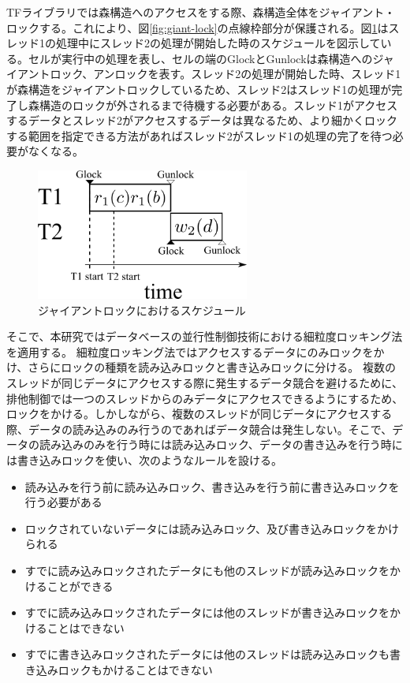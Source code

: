 \documentclass[a4paper]{jreport}	%
\begin{document}
TFライブラリでは森構造へのアクセスをする際、森構造全体をジャイアント・ロックする。これにより、図\ref{fig:giant-lock}の点線枠部分が保護される。図\ref{fig:g-lock-time}はスレッド1の処理中にスレッド2の処理が開始した時のスケジュールを図示している。セルが実行中の処理を表し、セルの端のGlockとGunlockは森構造へのジャイアントロック、アンロックを表す。スレッド2の処理が開始した時、スレッド1が森構造をジャイアントロックしているため、スレッド2はスレッド1の処理が完了し森構造のロックが外されるまで待機する必要がある。スレッド1がアクセスするデータとスレッド2がアクセスするデータは異なるため、より細かくロックする範囲を指定できる方法があればスレッド2がスレッド1の処理の完了を待つ必要がなくなる。


\begin{figure}[h] 
\centering
\includegraphics[width=7cm]{g-lock-time.png}	
\caption{ジャイアントロックにおけるスケジュール}
\label{fig:g-lock-time}
\end{figure}

そこで、本研究ではデータベースの並行性制御技術における細粒度ロッキング法を適用する。
細粒度ロッキング法ではアクセスするデータにのみロックをかけ、さらにロックの種類を読み込みロックと書き込みロックに分ける。
複数のスレッドが同じデータにアクセスする際に発生するデータ競合を避けるために、排他制御では一つのスレッドからのみデータにアクセスできるようにするため、ロックをかける。しかしながら、複数のスレッドが同じデータにアクセスする際、データの読み込みのみ行うのであればデータ競合は発生しない。そこで、データの読み込みのみを行う時には読み込みロック、データの書き込みを行う時には書き込みロックを使い、次のようなルールを設ける。

\begin{itemize}
 \item 読み込みを行う前に読み込みロック、書き込みを行う前に書き込みロックを行う必要がある
 \item ロックされていないデータには読み込みロック、及び書き込みロックをかけられる
 \item すでに読み込みロックされたデータにも他のスレッドが読み込みロックをかけることができる
 \item すでに読み込みロックされたデータには他のスレッドが書き込みロックをかけることはできない
 \item すでに書き込みロックされたデータには他のスレッドは読み込みロックも書き込みロックもかけることはできない
\end{itemize}
\end{document}
